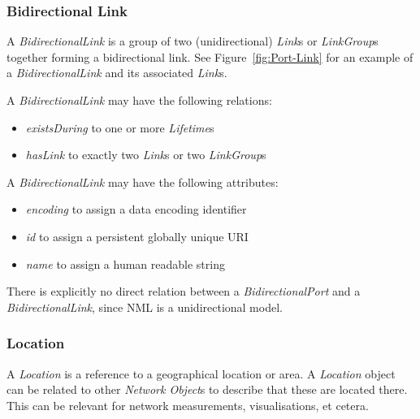 \subsubsection{Bidirectional Link}%
\label{class:bidirectional_link}

A \emph{BidirectionalLink} is a group of two (unidirectional) \emph{Link}s or \emph{LinkGroup}s together forming a bidirectional link. See Figure~\ref{fig:Port-Link} for an example of a \emph{BidirectionalLink} and its associated \emph{Link}s.

A \emph{BidirectionalLink} may have the following relations:
\begin{itemize}
    \item \emph{existsDuring} to one or more \emph{Lifetime}s
    \item \emph{hasLink} to exactly two \emph{Link}s or two \emph{LinkGroup}s
\end{itemize}

A \emph{BidirectionalLink} may have the following attributes:
\begin{itemize}
    \item \emph{encoding} to assign a data encoding identifier
    \item \emph{id} to assign a persistent globally unique URI
    \item \emph{name} to assign a human readable string
\end{itemize}

There is explicitly no direct relation between a \emph{BidirectionalPort} and a \emph{BidirectionalLink}, since NML is a unidirectional model.


\subsubsection{Location}%
\label{class:location}

A \emph{Location} is a reference to a geographical location or area. A \emph{Location} object can be related to other \emph{Network Object}s to describe that these are located there. This can be relevant for network measurements, visualisations, et cetera.

